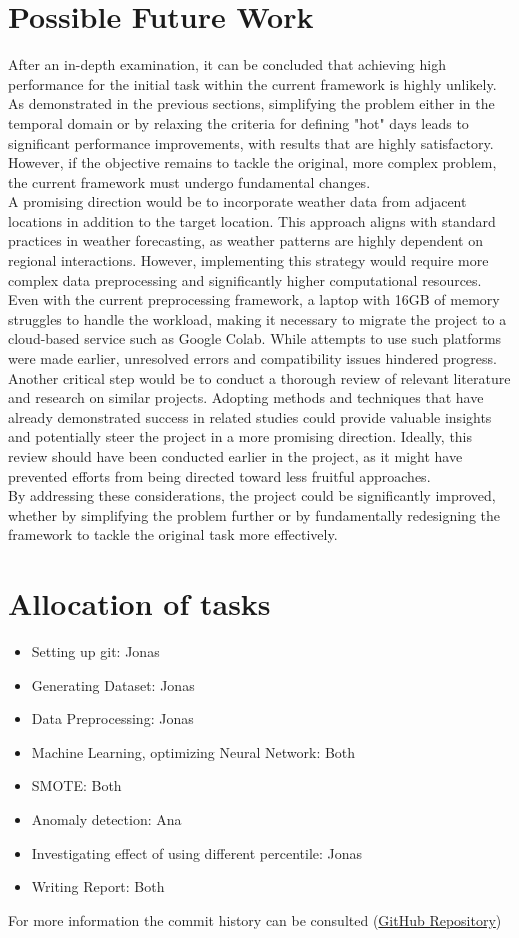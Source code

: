 \documentclass[8pt,a4paper]{article}
\begin{document}
\section{Possible Future Work}
After an in-depth examination, it can be concluded that achieving high performance for the initial task within the current framework is highly unlikely. As demonstrated in the previous sections, simplifying the problem either in the temporal domain or by relaxing the criteria for defining "hot" days leads to significant performance improvements, with results that are highly satisfactory. However, if the objective remains to tackle the original, more complex problem, the current framework must undergo fundamental changes.\\
A promising direction would be to incorporate weather data from adjacent locations in addition to the target location. This approach aligns with standard practices in weather forecasting, as weather patterns are highly dependent on regional interactions. However, implementing this strategy would require more complex data preprocessing and significantly higher computational resources. Even with the current preprocessing framework, a laptop with 16GB of memory struggles to handle the workload, making it necessary to migrate the project to a cloud-based service such as Google Colab. While attempts to use such platforms were made earlier, unresolved errors and compatibility issues hindered progress.\\
Another critical step would be to conduct a thorough review of relevant literature and research on similar projects. Adopting methods and techniques that have already demonstrated success in related studies could provide valuable insights and potentially steer the project in a more promising direction. Ideally, this review should have been conducted earlier in the project, as it might have prevented efforts from being directed toward less fruitful approaches.\\
By addressing these considerations, the project could be significantly improved, whether by simplifying the problem further or by fundamentally redesigning the framework to tackle the original task more effectively.


\section{Allocation of tasks}
\begin{itemize}
\item Setting up git: Jonas
\item Generating Dataset: Jonas
\item Data Preprocessing: Jonas
\item Machine Learning, optimizing Neural Network: Both
\item SMOTE: Both
\item Anomaly detection: Ana
\item Investigating effect of using different percentile: Jonas
\item Writing Report: Both
\end{itemize}
For more information the commit history can be consulted (\href{https://github.com/JonasThalmeier/MALIS_heatForecast}{GitHub Repository})
\end{document}
